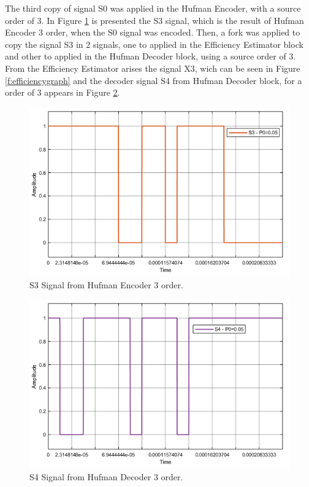 \begin{refsection}
The third copy of signal S0 was applied in the Hufman Encoder, with a source order of 3. In Figure \ref{f:S3} is presented the S3 signal, which is the result of Hufman Encoder 3 order, when the S0 signal was encoded.
Then, a fork was applied to copy the signal S3 in 2 signals, one to applied in the Efficiency Estimator block and other to applied in the Hufman Decoder block, using a source order of 3.
From the Efficiency Estimator arises the signal X3, wich can be seen in Figure \ref{f:efficiencygraph} and the decoder signal S4 from Hufman Decoder block, for a order of 3 appears in Figure \ref{f:S4}.

\begin{figure}[!h]
\centering
\includegraphics[width=5in]{./sdf/eit_45550_estimator_source_code_efficiency/figures/S3.png}
\caption[S3 Signal from Hufman Encoder 3 order.]{S3 Signal from Hufman Encoder 3 order.}
\label{f:S3}
\end{figure}


\begin{figure}[!h]
\centering
\includegraphics[width=5in]{./sdf/eit_45550_estimator_source_code_efficiency/figures/S4.png}
\caption[S4 Signal from Hufman Decoder 3 order.]{S4 Signal from Hufman Decoder 3 order.}
\label{f:S4}
\end{figure}


\end{refsection}
